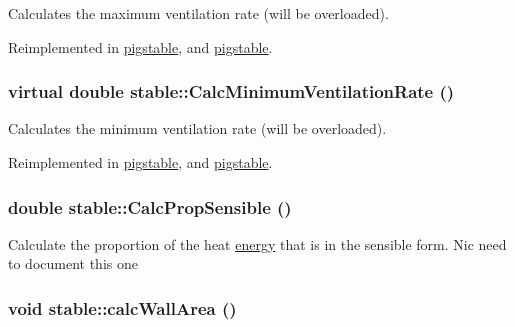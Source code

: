 Calculates the maximum ventilation rate (will be overloaded). 

Reimplemented in \hyperlink{classpigstable_a8b3e2aff62122c23b6b6e95829731b80}{pigstable}, and \hyperlink{classpigstable_a1695437806e4b3d9a68c0ec872a4f846}{pigstable}.\hypertarget{classstable_a9bd7855c10c562f9ea785d6ba3608dcc}{
\subsubsection[{CalcMinimumVentilationRate}]{\setlength{\rightskip}{0pt plus 5cm}virtual double stable::CalcMinimumVentilationRate ()}}
\label{classstable_a9bd7855c10c562f9ea785d6ba3608dcc}


Calculates the minimum ventilation rate (will be overloaded). 

Reimplemented in \hyperlink{classpigstable_ae93e1ef050422ae6e4e156b888a56330}{pigstable}, and \hyperlink{classpigstable_a9dc314d78207fccac503793e8fa4885d}{pigstable}.\hypertarget{classstable_a194dfcdf2c3f49d3683205ef972fd674}{
\subsubsection[{CalcPropSensible}]{\setlength{\rightskip}{0pt plus 5cm}double stable::CalcPropSensible ()}}
\label{classstable_a194dfcdf2c3f49d3683205ef972fd674}


Calculate the proportion of the heat \hyperlink{classenergy}{energy} that is in the sensible form. Nic need to document this one \hypertarget{classstable_a4f31b768e529147a0b6eb3053b7f32d6}{
\subsubsection[{calcWallArea}]{\setlength{\rightskip}{0pt plus 5cm}void stable::calcWallArea ()}}
\label{classstable_a4f31b768e529147a0b6eb3053b7f32d6}



